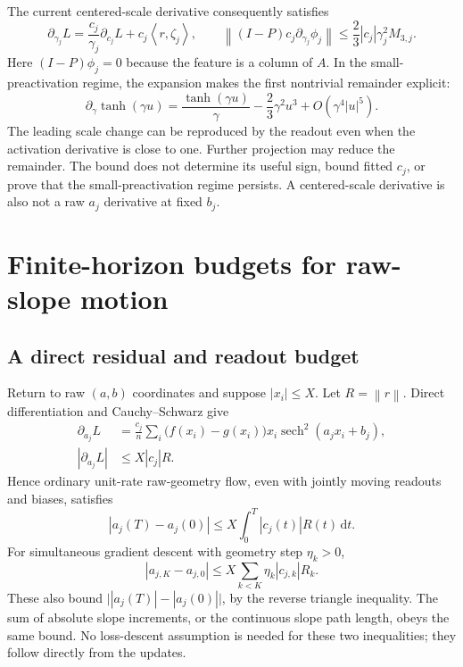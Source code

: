 \documentclass[11pt]{article}
\theoremstyle{remark}
\newcommand{\norm}[1]{\left\lVert #1\right\rVert}
\newcommand{\ip}[2]{\left\langle #1,#2\right\rangle}
\newcommand{\sech}{\operatorname{sech}}
\newcommand{\dd}{\,\mathrm{d}}
\begin{document}
The current centered-scale derivative consequently satisfies
\begin{equation}
 \partial_{\gamma_j}L
 =\frac{c_j}{\gamma_j}\partial_{c_j}L+c_j\ip{r}{\zeta_j},
 \qquad
 \norm{(I-P)c_j\partial_{\gamma_j}\phi_j}
 \leq\frac23|c_j|\gamma_j^2M_{3,j}.
 \label{eq:tanh-compensation}
\end{equation}
Here $(I-P)\phi_j=0$ because the feature is a column of $A$. In the small-preactivation regime, the expansion makes the first nontrivial remainder explicit:
\begin{equation}
 \partial_\gamma\tanh(\gamma u)
 =\frac{\tanh(\gamma u)}{\gamma}
   -\frac23\gamma^2u^3+O(\gamma^4|u|^5).
\end{equation}
The leading scale change can be reproduced by the readout even when the activation derivative is close to one. Further projection may reduce the remainder. The bound does not determine its useful sign, bound fitted $c_j$, or prove that the small-preactivation regime persists. A centered-scale derivative is also not a raw $a_j$ derivative at fixed $b_j$.

\section{Finite-horizon budgets for raw-slope motion}
\subsection{A direct residual and readout budget}

Return to raw $(a,b)$ coordinates and suppose $|x_i|\leq X$. Let $R=\norm{r}$. Direct differentiation and Cauchy--Schwarz give
\begin{align}
 \partial_{a_j}L
 &=\frac{c_j}{n}\sum_i\bigl(f(x_i)-g(x_i)\bigr)x_i\sech^2(a_jx_i+b_j),\\
 |\partial_{a_j}L|&\leq X|c_j|R.
 \label{eq:raw-gradient-bound}
\end{align}
Hence ordinary unit-rate raw-geometry flow, even with jointly moving readouts and biases, satisfies
\begin{equation}
 |a_j(T)-a_j(0)|\leq X\int_0^T|c_j(t)|R(t)\dd t.
 \label{eq:residual-budget-flow}
\end{equation}
For simultaneous gradient descent with geometry step $\eta_k>0$,
\begin{equation}
 |a_{j,K}-a_{j,0}|\leq X\sum_{k<K}\eta_k|c_{j,k}|R_k.
 \label{eq:residual-budget-discrete}
\end{equation}
These also bound $\bigl||a_j(T)|-|a_j(0)|\bigr|$, by the reverse triangle inequality. The sum of absolute slope increments, or the continuous slope path length, obeys the same bound. No loss-descent assumption is needed for these two inequalities; they follow directly from the updates.
\end{document}
